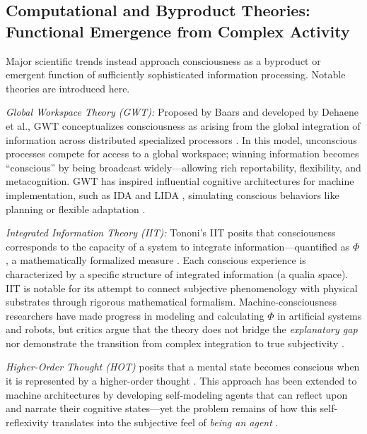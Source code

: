 \subsection{Computational and Byproduct Theories: Functional Emergence from Complex Activity}

Major scientific trends instead approach consciousness as a byproduct or emergent function of sufficiently sophisticated information processing. Notable theories are introduced here.

\emph{Global Workspace Theory (GWT):} Proposed by Baars \citeyear{baars1988cognitive} and developed by Dehaene et al., GWT conceptualizes consciousness as arising from the global integration of information across distributed specialized processors \cite{baars2001conscious,dehaene2021consciousness}. In this model, unconscious processes compete for access to a global workspace; winning information becomes ``conscious'' by being broadcast widely---allowing rich reportability, flexibility, and metacognition. GWT has inspired influential cognitive architectures for machine implementation, such as IDA and LIDA \cite{franklin2014consciousness}, simulating conscious behaviors like planning or flexible adaptation \cite{qin2025taxonomy}.

\emph{Integrated Information Theory (IIT):} Tononi's IIT posits that consciousness corresponds to the capacity of a system to integrate information---quantified as $\Phi$, a mathematically formalized measure \cite{albantakis2023integrated,tononi2016integrated}. Each conscious experience is characterized by a specific structure of integrated information (a qualia space). IIT is notable for its attempt to connect subjective phenomenology with physical substrates through rigorous mathematical formalism. Machine-consciousness researchers have made progress in modeling and calculating $\Phi$ in artificial systems and robots, but critics argue that the theory does not bridge the \emph{explanatory gap} nor demonstrate the transition from complex integration to true subjectivity \cite{garridomerchan2024machine,qin2025taxonomy}.

\emph{Higher-Order Thought (HOT)} posits that a mental state becomes conscious when it is represented by a higher-order thought \cite{brown2019higher,rosenthal2009concepts}. This approach has been extended to machine architectures by developing self-modeling agents that can reflect upon and narrate their cognitive states---yet the problem remains of how this self-reflexivity translates into the subjective feel of \emph{being an agent} \cite{qin2025taxonomy}.

